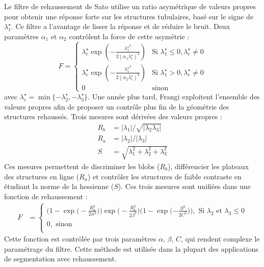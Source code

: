 Le filtre de rehaussement de Sato utilise un ratio asymétrique de valeurs propres pour obtenir une réponse forte sur les structures tubulaires, basé sur le signe de $\lambda^\star_1$.
Ce filtre a l'avantage de lisser la réponse et de réduire le bruit. Deux paramètres $\alpha_1$ et $\alpha_2$ contrôlent la force de cette asymétrie :
\begin{equation}
\nonumber
F =
\left\{
\begin{array}{ll}
\lambda^\star_c \exp(-\frac{{\lambda^\star_1}^2}{2(\alpha_1 \lambda^\star_c)^2})  & 
\textrm{Si } \lambda^\star_1 \leqslant 0, \lambda^\star_c \neq 0 \\
\lambda^\star_c \exp(-\frac{{\lambda^\star_1}^2}{2(\alpha_2\lambda^\star_c)^2})  &  
\textrm{Si } \lambda^\star_1 > 0, \lambda^\star_c \neq 0 \\
0 & \textrm{sinon}
\end{array}
\right.
\end{equation}
avec $\lambda^\star_c = \min\{-\lambda^\star_2,-\lambda^\star_3\}$.
Une année plus tard, Frangi \etal \cite{Frangi1998_vesselness} exploitent l'ensemble des valeurs propres afin de proposer un contrôle plus fin de la géométrie des structures rehaussés. Trois mesures sont dérivées des valeurs propres :
\begin{align}
 \nonumber
  R_b & = |\lambda_1| / \sqrt{|\lambda_2\lambda_3|}\\
R_a & = |\lambda_2| / |\lambda_3| \nonumber\\
S & = \sqrt{\lambda^2_1 + \lambda^2_2 + \lambda^2_3} \nonumber
\end{align}
Ces mesures permettent de discriminer les blobs ($R_b$), différencier les plateaux des structures en ligne ($R_a$) et contrôler les structures de faible contraste en étudiant la norme de la hessienne ($S$). Ces trois mesures sont unifiées dans une fonction de rehaussement :   
\begin{align}
  F & = \begin{cases} 
                \big(1-\exp\big(-\frac{R_a^2}{2\alpha^2}\big)\big) \exp\big(-\frac{R_b^2}{2\beta^2}\big)\big(1-\exp(-\frac{S^2}{2C^2}\big)\big), \textrm{~Si~} \lambda_2 \textrm{~et~} \lambda_3 \leqslant 0   \\
                0, \textrm{ sinon} \\
              \end{cases}
\end{align}
Cette fonction est contrôlée par trois paramètres $\alpha$, $\beta$, $C$, qui rendent complexe le paramétrage du filtre. Cette méthode est utilisée dans la plupart des applications de segmentation avec rehaussement.

